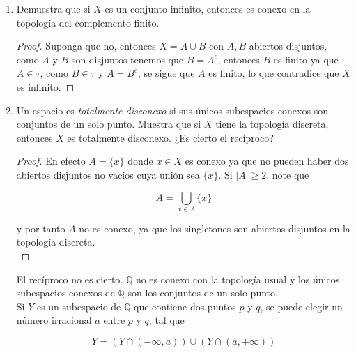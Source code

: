 \documentclass[12bpt]{article}
\begin{document}
\begin{enumerate}
    \begin{proof}
        Note que $$A\cup \bigcup_{\alpha}A_{\alpha}=\bigcup_{\alpha}(A\cup A_{\alpha})$$

        y como $A\subset \displaystyle \bigcap_{\alpha}(A\cup A_{\alpha}) 
            $, y $A\neq \emptyset$, El conjunto $\{A \cup A_{\alpha}\}_{\alpha}$ es una colección de subespacios conexos de X con un punto en común, de donde se conluye lo deseado.
    \end{proof}
    
    \item Demuestra que si $X$ es un conjunto infinito, entonces es conexo en la topología del complemento finito.

    \begin{proof}
        Suponga que no, entonces $X=A\cup B$ con $A,B$ abiertos disjuntos, como $A$ y $B$ son disjuntos tenemos que $B=A^{c}$, entonces $B$ es finito ya que $A\in \tau$, como $B\in \tau$ y $A=B^{c}$, se sigue que $A$ es finito, lo que contradice que $X$ es infinito.
    \end{proof}
    
    \item Un espacio es \textit{totalmente disconexo} si sus únicos subespacios conexos son conjuntos de un solo punto. Muestra que si $X$ tiene la topología discreta, entonces $X$ es totalmente disconexo. ¿Es cierto el recíproco?

    \begin{proof}
        En efecto $A=\{x\}$ donde ${x\in X}$ es conexo ya que no pueden haber dos abiertos disjuntos no vacíos cuya unión sea $\{x\}$. Si $|A|\geq 2$, note que 

        $$A=\bigcup_{x\in A}\{x\}
            $$

        y por tanto $A$ no es conexo, ya que los singletones son abiertos disjuntos en la topología discreta.\\
    \end{proof}
    
    El recíproco no es cierto. $\mathbb{Q}$ no es conexo con la topología usual y los únicos subespacios conexos de $\mathbb{Q}$ son los conjuntos de un solo punto.\\

    Si $Y$ es un subespacio de $\mathbb{Q}$ que contiene dos puntos $p$ y $q$, se puede elegir un número irracional $a$ entre $p$ y $q$, tal que

$$
Y=(Y \cap (-\infty, a)) \cup  (Y \cap (a, +\infty))
$$


\end{enumerate}
\end{document}
